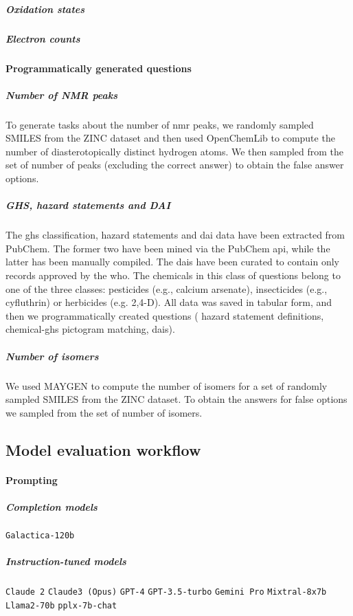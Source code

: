 \documentclass[11pt, oneside]{article}
\begin{document}
\subparagraph{Oxidation states}

\subparagraph{Electron counts}

\paragraph{Programmatically generated questions} 
\subparagraph{Number of NMR peaks} To generate tasks about the number of \gls{nmr} peaks, we randomly sampled SMILES from the ZINC dataset and then used OpenChemLib\cite{openchemlib} to compute the number of diasterotopically distinct hydrogen atoms. 
We then sampled from the set of number of peaks (excluding the correct answer) to obtain the false answer options.

\subparagraph{GHS, hazard statements and DAI}
The \gls{ghs} classification, hazard statements and  \gls{dai} data have been extracted from PubChem. \cite{pubchem}
The former two have been mined via the PubChem \gls{api}, while the latter has been manually compiled.
The \glspl{dai} have been curated to contain only records approved by the \gls{who}. 
The chemicals in this class of questions belong to one of the three classes: pesticides (e.g., calcium arsenate), insecticides (e.g., cyfluthrin) or herbicides (e.g. 2,4-D). 
All data was saved in tabular form, and then we programmatically created questions ( hazard statement definitions,  chemical-\gls{ghs} pictogram matching,  \glspl{dai}).


\subparagraph{Number of isomers}
We used MAYGEN\cite{Yirik_2021} to compute the number of isomers for a set of randomly sampled SMILES from the ZINC dataset.
To obtain the answers for false options we sampled from the set of number of isomers.

\subsection{Model evaluation workflow}

\paragraph{Prompting}

\subparagraph{Completion models}
\texttt{Galactica-120b}\cite{taylor2022galactica}


\subparagraph{Instruction-tuned models} \texttt{Claude 2} \texttt{Claude3 (Opus)}\cite{anthropicClaudeModelFamily2024}
\texttt{GPT-4}\cite{openai2024gpt4}
\texttt{GPT-3.5-turbo}\cite{brown2020language}
\texttt{Gemini Pro}\cite{gemini}
\texttt{Mixtral-8x7b}\cite{jiang2024mixtral}
\texttt{Llama2-70b}\cite{touvron2023llama}
\texttt{pplx-7b-chat}
\end{document}
